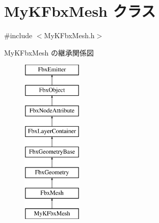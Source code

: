 \hypertarget{class_my_k_fbx_mesh}{}\section{My\+K\+Fbx\+Mesh クラス}
\label{class_my_k_fbx_mesh}


{\ttfamily \#include $<$My\+K\+Fbx\+Mesh.\+h$>$}

My\+K\+Fbx\+Mesh の継承関係図\begin{figure}[H]
\begin{center}
\leavevmode
\includegraphics[height=8.000000cm]{class_my_k_fbx_mesh}
\end{center}
\end{figure}
